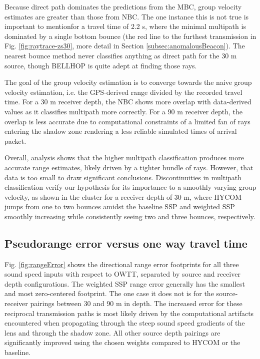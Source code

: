 Because direct path dominates the predictions from the MBC, group velocity estimates are greater than those from NBC.
The one instance this is not true is important to mention\textemdash for a travel time of 2.2 s, where the minimal multipath is dominated by a single bottom bounce (the red line to the furthest transmission in Fig. \ref{fig:raytrace-zs30}, more detail in Section \ref{subsec:anomalousBeacon}).
The nearest bounce method never classifies anything as direct path for the 30 m source, though BELLHOP is quite adept at finding those rays. 

The goal of the group velocity estimation is to converge towards the naive group velocity estimation, i.e. the GPS-derived range divided by the recorded travel time.
For a 30 m receiver depth, the NBC shows more overlap with data-derived values as it classifies multipath more correctly.
For a 90 m receiver depth, the overlap is less accurate due to computational constraints of a limited fan of rays entering the shadow zone rendering a less reliable simulated times of arrival packet.

Overall, analysis shows that the higher multipath classification produces more accurate range estimates, likely driven by a tighter bundle of rays.
However, that data is too small to draw significant conclusions.
Discontinuities in multipath classification verify our hypothesis for its importance to a smoothly varying group velocity, as shown in the cluster for a receiver depth of 30 m, where HYCOM jumps from one to two bounces amidst the baseline SSP and weighted SSP smoothly increasing while consistently seeing two and three bounces, respectively.

\FloatBarrier
\subsection{Pseudorange error versus one way travel time}

Fig. \ref{fig:rangeError} shows the directional range error footprints for all three sound speed inputs with respect to OWTT, separated by source and receiver depth configurations.
The weighted SSP range error generally has the smallest and most zero-centered footprint.
The one case it does not is for the source-receiver pairings between 30 and 90 m in depth.
The increased error for these reciprocal transmission paths is most likely driven by the computational artifacts encountered when propagating through the steep sound speed gradients of the lens and through the shadow zone.
All other source depth pairings are significantly improved using the chosen weights compared to HYCOM or the baseline.

